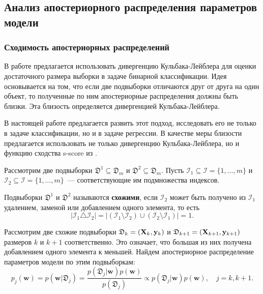 \subsection{Анализ апостериорного распределения параметров модели}

\subsubsection{Сходимость апостериорных распределений}

В работе \citep{MOTRENKO2014743} предлагается использовать дивергенцию Кульбака-Лейблера для оценки достаточного размера выборки в задаче бинарной классификации. Идея основывается на том, что если две подвыборки отличаются друг от друга на один объект, то полученные по ним апостериорные распределения должны быть близки. Эта близость определяется дивергенцией Кульбака-Лейблера. 

В настоящей работе предлагается развить этот подход, исследовать его не только в задаче классификации, но и в задаче регрессии. В качестве меры близости предлагается использовать не только дивергенцию Кульбака-Лейблера, но и функцию сходства s-score из \citep{Aduenko2017}.

Рассмотрим две подвыборки $\mathfrak{D}^1 \subseteq \mathfrak{D}_m$ и $\mathfrak{D}^2 \subseteq \mathfrak{D}_m$. Пусть $\mathcal{I}_1 \subseteq \mathcal{I} = \{ 1, \ldots, m \}$ и $\mathcal{I}_2 \subseteq \mathcal{I} = \{ 1, \ldots, m \}$~--- соответствующие им подмножества индексов.

\begin{definition}
    Подвыборки $\mathfrak{D}^1$ и $\mathfrak{D}^2$ называются \textbf{схожими}, если $\mathcal{I}_2$ может быть получено из $\mathcal{I}_1$ удалением, заменой или добавлением одного элемента, то есть
    \[ \left| \mathcal{I}_1 \triangle \mathcal{I}_2 \right| = \left| \left( \mathcal{I}_1 \setminus \mathcal{I}_2 \right) \cup \left( \mathcal{I}_2 \setminus \mathcal{I}_1 \right) \right| = 1. \]
\end{definition}

Рассмотрим две схожие подвыборки $\mathfrak{D}_k = (\mathbf{X}_k, \mathbf{y}_k)$ и $\mathfrak{D}_{k+1} = (\mathbf{X}_{k+1}, \mathbf{y}_{k+1})$ размеров $k$ и $k+1$ соответственно. Это означает, что большая из них получена добавлением одного элемента к меньшей. Найдем апостериорное распределение параметров модели по этим подвыборкам:
\[p_j(\mathbf{w}) = p(\mathbf{w} | \mathfrak{D}_j) = \dfrac{p(\mathfrak{D}_j | \mathbf{w}) p(\mathbf{w})}{p(\mathfrak{D}_j)} \propto p(\mathfrak{D}_j | \mathbf{w}) p(\mathbf{w}), \quad j = k, k+1. \]

